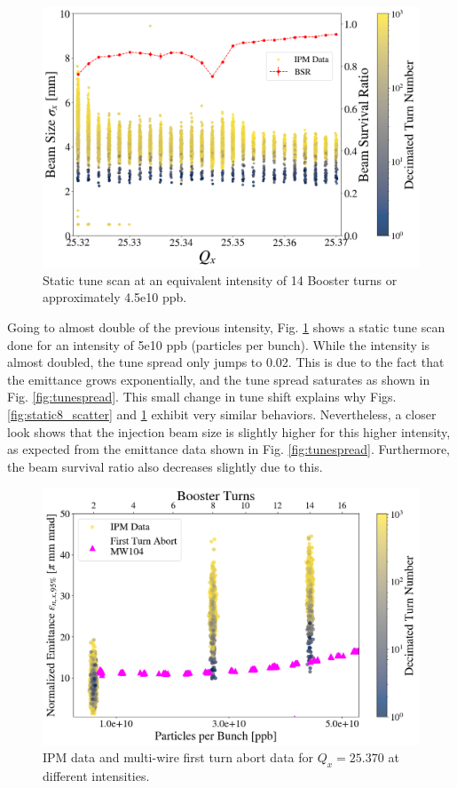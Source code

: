\begin{figure}[H]
    \centering
    \includegraphics[width=\columnwidth]{chapter6/static14turns_dampersOFF.png}
    \caption{Static tune scan at an equivalent intensity of 14 Booster turns or approximately 4.5e10 ppb.}
    \label{fig:static14_scatter}
\end{figure}

Going to almost double of the previous intensity, Fig. \ref{fig:static14_scatter} shows a static tune scan done for an intensity of 5e10 ppb (particles per bunch). While the intensity is almost doubled, the tune spread only jumps to 0.02. This is due to the fact that the emittance grows exponentially, and the tune spread saturates as shown in Fig. \ref{fig:tunespread}. This small change in tune shift explains why Figs. \ref{fig:static8_scatter} and \ref{fig:static14_scatter} exhibit very similar behaviors. Nevertheless, a closer look shows that the injection beam size is slightly higher for this higher intensity, as expected from the emittance data shown in Fig. \ref{fig:tunespread}. Furthermore, the beam survival ratio also decreases slightly due to this. 

\begin{figure}[H]
    \centering
    \includegraphics[width=\columnwidth]{chapter6/25370_scatter.png}
    \caption{IPM data and multi-wire first turn abort data for $Q_x=25.370$ at different intensities.}
    \label{fig:25370_scatter}
\end{figure}

